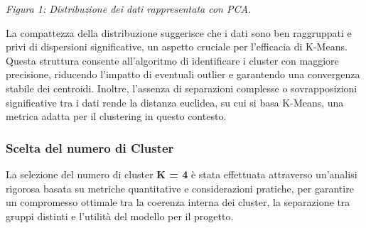 \documentclass[a4paper,12pt]{article}
\begin{document}
\begin{enumerate}
\begin{center}
\textit{Figura 1: Distribuzione dei dati rappresentata con PCA.}
\end{center}

La compattezza della distribuzione suggerisce che i dati sono ben raggruppati e privi di dispersioni significative, un aspetto cruciale per l'efficacia di K-Means. Questa struttura consente all'algoritmo di identificare i cluster con maggiore precisione, riducendo l'impatto di eventuali outlier e garantendo una convergenza stabile dei centroidi. Inoltre, l'assenza di separazioni complesse o sovrapposizioni significative tra i dati rende la distanza euclidea, su cui si basa K-Means, una metrica adatta per il clustering in questo contesto.
	\end{enumerate}
\newpage
	\subsubsection{Scelta del numero di Cluster}
La selezione del numero di cluster \textbf{K = 4} è stata effettuata attraverso un'analisi rigorosa basata su metriche quantitative e considerazioni pratiche, per garantire un compromesso ottimale tra la coerenza interna dei cluster, la separazione tra gruppi distinti e l'utilità del modello per il progetto.
\end{document}
